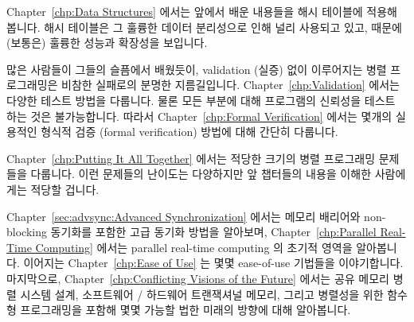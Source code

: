 Chapter~\ref{chp:Data Structures} 에서는 앞에서 배운 내용들을 해시 테이블에
적용해 봅니다.
해시 테이블은 그 훌륭한 데이터 분리성으로 인해 널리 사용되고 있고, 때문에
(보통은) 훌륭한 성능과 확장성을 보입니다.
\iffalse

Chapter~\ref{chp:Data Structures} applies the lessons of previous
chapters to hash tables, which are heavily used due
to their excellent partitionability, which (usually) leads to excellent
performance and scalability.
\fi

많은 사람들이 그들의 슬픔에서 배웠듯이, validation (실증) 없이 이루어지는 병렬
프로그래밍은 비참한 실패로의 분명한 지름길입니다.
Chapter~\ref{chp:Validation} 에서는 다양한 테스트 방법을 다룹니다.
물론 모든 부분에 대해 프로그램의 신뢰성을 테스트 하는 것은 불가능합니다.
따라서 Chapter~\ref{chp:Formal Verification} 에서는 몇개의 실용적인 형식적
검증 (formal verification) 방법에 대해 간단히 다룹니다.
\iffalse

As many have learned to their sorrow, parallel programming without
validation is a sure path to abject failure.
Chapter~\ref{chp:Validation} covers various forms of testing.
It is of course impossible to test reliability into your program
after the fact, so Chapter~\ref{chp:Formal Verification}
follows up with a brief overview of a couple of practical approaches to
formal verification.
\fi

Chapter~\ref{chp:Putting It All Together} 에서는 적당한 크기의 병렬 프로그래밍
문제들을 다룹니다.
이런 문제들의 난이도는 다양하지만 앞 챕터들의 내용을 이해한 사람에게는 적당할
겁니다.
\iffalse

Chapter~\ref{chp:Putting It All Together}
contains a series of moderate-sized parallel programming problems.
The difficulty of these problems vary, but should be appropriate for
someone who has mastered the material in the previous chapters.
\fi

Chapter~\ref{sec:advsync:Advanced Synchronization} 에서는 메모리 배리어와
non-blocking 동기화를 포함한 고급 동기화 방법을 알아보며,
Chapter~\ref{chp:Parallel Real-Time Computing} 에서는 parallel real-time
computing 의 초기적 영역을 알아봅니다.
이어지는 Chapter~\ref{chp:Ease of Use} 는 몇몇 ease-of-use 기법들을
이야기합니다.
마지막으로, Chapter~\ref{chp:Conflicting Visions of the Future} 에서는 공유
메모리 병렬 시스템 설계, 소프트웨어 / 하드웨어 트랜잭셔널 메모리, 그리고
병렬성을 위한 함수형 프로그래밍을 포함해 몇몇 가능할 법한 미래의 방향에 대해
알아봅니다.
\iffalse

Chapter~\ref{sec:advsync:Advanced Synchronization}
looks at advanced synchronization methods, including
non-blocking synchronization and parallel real-time computing,
while Chapter~\ref{chp:Advanced Synchronization: Memory Ordering}
covers the advanced topic of memory ordering.
Chapter~\ref{chp:Ease of Use} follows up with some ease-of-use advice.
Finally, Chapter~\ref{chp:Conflicting Visions of the Future}
looks at a few possible future directions, including
shared-memory parallel system design, software and hardware transactional
memory, and functional programming for parallelism.
\fi

